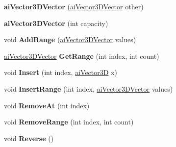\begin{DoxyCompactItemize}
\item 
\hypertarget{classai_vector3_d_vector_ad8ec95ad2897761f042fbc26e86505cf}{{\bfseries ai\+Vector3\+D\+Vector} (\hyperlink{classai_vector3_d_vector}{ai\+Vector3\+D\+Vector} other)}\label{classai_vector3_d_vector_ad8ec95ad2897761f042fbc26e86505cf}

\item 
\hypertarget{classai_vector3_d_vector_a1e279f14f9a6414983515e7097650fbc}{{\bfseries ai\+Vector3\+D\+Vector} (int capacity)}\label{classai_vector3_d_vector_a1e279f14f9a6414983515e7097650fbc}

\item 
\hypertarget{classai_vector3_d_vector_a4d5f6dcbd2894b9b132c836a75479b33}{void {\bfseries Add\+Range} (\hyperlink{classai_vector3_d_vector}{ai\+Vector3\+D\+Vector} values)}\label{classai_vector3_d_vector_a4d5f6dcbd2894b9b132c836a75479b33}

\item 
\hypertarget{classai_vector3_d_vector_a5388f4c4bf6fd8cf63025696dd16514f}{\hyperlink{classai_vector3_d_vector}{ai\+Vector3\+D\+Vector} {\bfseries Get\+Range} (int index, int count)}\label{classai_vector3_d_vector_a5388f4c4bf6fd8cf63025696dd16514f}

\item 
\hypertarget{classai_vector3_d_vector_a325f0fa3ad5a87ae37089307a26ff0db}{void {\bfseries Insert} (int index, \hyperlink{structai_vector3_d}{ai\+Vector3\+D} x)}\label{classai_vector3_d_vector_a325f0fa3ad5a87ae37089307a26ff0db}

\item 
\hypertarget{classai_vector3_d_vector_ac3369404bea02663bba14bd891c72b96}{void {\bfseries Insert\+Range} (int index, \hyperlink{classai_vector3_d_vector}{ai\+Vector3\+D\+Vector} values)}\label{classai_vector3_d_vector_ac3369404bea02663bba14bd891c72b96}

\item 
\hypertarget{classai_vector3_d_vector_ab06aa16d93d3405e5a264e36733666f6}{void {\bfseries Remove\+At} (int index)}\label{classai_vector3_d_vector_ab06aa16d93d3405e5a264e36733666f6}

\item 
\hypertarget{classai_vector3_d_vector_aecef1e7df488d7a055db72755c2c1c68}{void {\bfseries Remove\+Range} (int index, int count)}\label{classai_vector3_d_vector_aecef1e7df488d7a055db72755c2c1c68}

\item 
\hypertarget{classai_vector3_d_vector_ad1ac7bff785a20a03677f4c14d8380e0}{void {\bfseries Reverse} ()}\label{classai_vector3_d_vector_ad1ac7bff785a20a03677f4c14d8380e0}


\end{DoxyCompactItemize}
